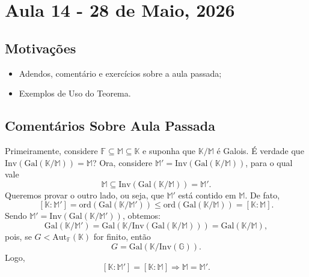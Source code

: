 \documentclass[../algebraIII_notes.tex]{subfiles}
\begin{document}
\section{Aula 14 - 28 de Maio, 2026}
\subsection{Motivações}
\begin{itemize}
	\item Adendos, comentário e exercícios sobre a aula passada;
	\item Exemplos de Uso do Teorema.
\end{itemize}
\subsection{Comentários Sobre Aula Passada}
Primeiramente, considere \(\mathbb{F}\subseteq \mathbb{M}\subseteq \mathbb{K}\) e suponha que \(\mathbb{K}/\mathbb{M}\) é Galois. É verdade que \(\mathrm{Inv}(\mathrm{Gal}(\mathbb{K}/\mathbb{M}))=\mathbb{M}\)? Ora, considere \(\mathbb{M}'=\mathrm{Inv}(\mathrm{Gal}(\mathbb{K}/\mathbb{M}))\), para o qual vale
\[
	\mathbb{M}\subseteq \mathrm{Inv}(\mathrm{Gal}(\mathbb{K}/\mathbb{M})) = \mathbb{M}'.
\]
Queremos provar o outro lado, ou seja, que \(\mathbb{M}'\) está contido em \(\mathbb{M}\). De fato,
\[
	[\mathbb{K}:\mathbb{M}'] = \mathrm{ord}(\mathrm{Gal}(\mathbb{K}/\mathbb{M}')) \leq \mathrm{ord}(\mathrm{Gal}(\mathbb{K}/\mathbb{M})) = [\mathbb{K}:\mathbb{M}].
\]
Sendo \(\mathbb{M}'= \mathrm{Inv}(\mathrm{Gal}(\mathbb{K}/\mathbb{M}'))\), obtemos:
\[
	\mathrm{Gal}(\mathbb{K}/\mathbb{M}') = \mathrm{Gal}(\mathbb{K}/\mathrm{Inv}(\mathrm{Gal}(\mathbb{K}/\mathbb{M}))) = \mathrm{Gal}(\mathbb{K}/\mathbb{M}),
\]
pois, se \(G<\mathrm{Aut}_{\mathbb{F}}(\mathbb{K})\) for finito, então
\[
	G = \mathrm{Gal}(\mathbb{K}/\mathrm{Inv}(\mathbb{G})).
\]
Logo,
\[
	[\mathbb{K}:\mathbb{M}'] = [\mathbb{K}:\mathbb{M}] \Rightarrow \mathbb{M} = \mathbb{M}'.
\]
\end{document}
